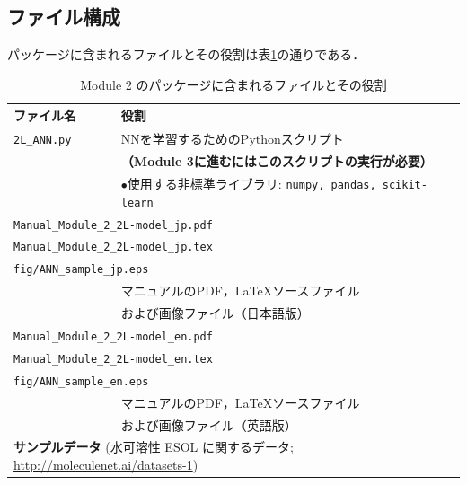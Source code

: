\documentclass[11pt, titlepage, dvipdfmx, twoside]{jarticle}
\newcommand{\tabref}[1]{表\ref{tab:#1}}
\begin{document}
\subsection{ファイル構成}
パッケージに含まれるファイルとその役割は\tabref{files}の通りである．
\begin{table}[h!]
  \centering
  \caption{Module 2 のパッケージに含まれるファイルとその役割}
  \label{tab:files}
  \begin{tabular}{lcll}
  \hline
  \bf ファイル名 &\ \ & \multicolumn{2}{l}{\bf 役割}\\
  \hline
  \verb|2L_ANN.py| && \multicolumn{2}{l}{NNを学習するためのPythonスクリプト}\\
  &&\multicolumn{2}{l}{\bf （Module 3に進むにはこのスクリプトの実行が必要）}\\
  &&\multicolumn{2}{l}{$\bullet$使用する非標準ライブラリ: {\tt numpy, pandas, scikit-learn}}\\
  \hline
  \multicolumn{4}{l}{\tt Manual\_Module\_2\_2L-model\_jp.pdf}\\
  \multicolumn{4}{l}{\tt Manual\_Module\_2\_2L-model\_jp.tex}\\
  \multicolumn{4}{l}{\tt fig/ANN\_sample\_jp.eps}\\
  &&\multicolumn{2}{l}{マニュアルのPDF，\LaTeX ソースファイル}\\
  &&\multicolumn{2}{l}{および画像ファイル（日本語版）}\\
  \hline
  \multicolumn{4}{l}{\tt Manual\_Module\_2\_2L-model\_en.pdf}\\
  \multicolumn{4}{l}{\tt Manual\_Module\_2\_2L-model\_en.tex}\\
  \multicolumn{4}{l}{\tt fig/ANN\_sample\_en.eps}\\
  &&\multicolumn{2}{l}{マニュアルのPDF，\LaTeX ソースファイル}\\
  &&\multicolumn{2}{l}{および画像ファイル（英語版）}\\
  \hline
  \multicolumn{4}{l}{{\bf サンプルデータ} (水可溶性 ESOL に関するデータ; \url{http://moleculenet.ai/datasets-1})}\\

\end{tabular}
\end{table}
\end{document}
